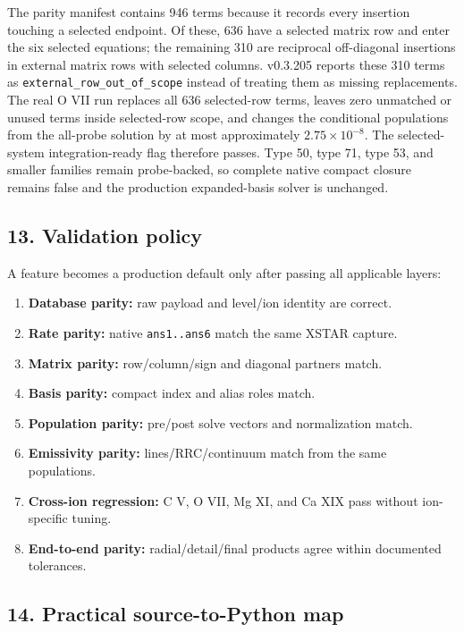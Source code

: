 \documentclass[
  10pt,
]{article}
\newcommand{\passthrough}[1]{#1}
\providecommand{\tightlist}{%
  \setlength{\itemsep}{0pt}\setlength{\parskip}{0pt}}
\begin{document}
The parity manifest contains 946 terms because it records every insertion touching a selected endpoint. Of these, 636 have a selected matrix row and enter the six selected equations; the remaining 310 are reciprocal off-diagonal insertions in external matrix rows with selected columns. v0.3.205 reports these 310 terms as \texttt{external\_row\_out\_of\_scope} instead of treating them as missing replacements. The real O VII run replaces all 636 selected-row terms, leaves zero unmatched or unused terms inside selected-row scope, and changes the conditional populations from the all-probe solution by at most approximately $2.75\times10^{-8}$. The selected-system integration-ready flag therefore passes. Type 50, type 71, type 53, and smaller families remain probe-backed, so complete native compact closure remains false and the production expanded-basis solver is unchanged.

\subsection{13. Validation policy}\label{validation-policy}

A feature becomes a production default only after passing all applicable
layers:

\begin{enumerate}
\def\labelenumi{\arabic{enumi}.}
\tightlist
\item
  \textbf{Database parity:} raw payload and level/ion identity are
  correct.
\item
  \textbf{Rate parity:} native \passthrough{\lstinline!ans1..ans6!}
  match the same XSTAR capture.
\item
  \textbf{Matrix parity:} row/column/sign and diagonal partners match.
\item
  \textbf{Basis parity:} compact index and alias roles match.
\item
  \textbf{Population parity:} pre/post solve vectors and normalization
  match.
\item
  \textbf{Emissivity parity:} lines/RRC/continuum match from the same
  populations.
\item
  \textbf{Cross-ion regression:} C V, O VII, Mg XI, and Ca XIX pass
  without ion-specific tuning.
\item
  \textbf{End-to-end parity:} radial/detail/final products agree within
  documented tolerances.
\end{enumerate}

\subsection{14. Practical source-to-Python
map}\label{practical-source-to-python-map}
\end{document}
